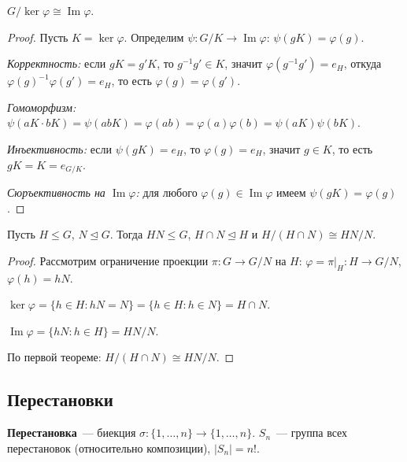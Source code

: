 \documentclass[12pt]{article}
\begin{document}
	\begin{theorem}
		$G / \ker \varphi \cong \operatorname{Im} \varphi$.
	\end{theorem}
	
	\begin{proof}
		Пусть $K = \ker \varphi$. Определим $\psi: G/K \to \operatorname{Im}\varphi$: $\psi(gK) = \varphi(g)$.
		
		\textit{Корректность:} если $gK = g'K$, то $g^{-1}g' \in K$, значит $\varphi(g^{-1}g') = e_H$, откуда $\varphi(g)^{-1}\varphi(g') = e_H$, то есть $\varphi(g) = \varphi(g')$.
		
		\textit{Гомоморфизм:} $\psi(aK \cdot bK) = \psi(abK) = \varphi(ab) = \varphi(a)\varphi(b) = \psi(aK)\psi(bK)$.
		
		\textit{Инъективность:} если $\psi(gK) = e_H$, то $\varphi(g) = e_H$, значит $g \in K$, то есть $gK = K = e_{G/K}$.
		
		\textit{Сюръективность на $\operatorname{Im}\varphi$:} для любого $\varphi(g) \in \operatorname{Im}\varphi$ имеем $\psi(gK) = \varphi(g)$.
	\end{proof}
	
	\begin{theorem}
		Пусть $H \leqslant G$, $N \trianglelefteq G$. Тогда $HN \leqslant G$, $H \cap N \trianglelefteq H$ и $H/(H \cap N) \cong HN/N$.
	\end{theorem}
	
	\begin{proof}
		Рассмотрим ограничение проекции $\pi: G \to G/N$ на $H$: $\varphi = \pi|_H: H \to G/N$, $\varphi(h) = hN$.
		
		$\ker \varphi = \{h \in H : hN = N\} = \{h \in H : h \in N\} = H \cap N$.
		
		$\operatorname{Im} \varphi = \{hN : h \in H\} = HN/N$.
		
		По первой теореме: $H/(H \cap N) \cong HN/N$.
	\end{proof}
	
	\subsection{Перестановки}
	
	\begin{definition}
		\textbf{Перестановка}~--- биекция $\sigma: \{1, \dots, n\} \to \{1, \dots, n\}$.
		$S_n$~--- группа всех перестановок (относительно композиции), $|S_n| = n!$.
	\end{definition}
	
\end{document}
